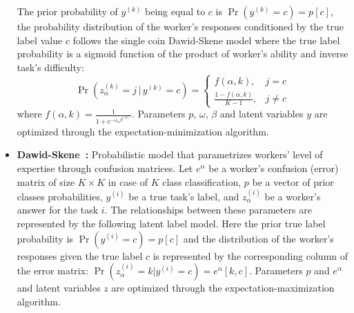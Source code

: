 \documentclass[default]{bst/sn-jnl_mine}%
\begin{document}
\begin{itemize}
    The prior probability of $y^{(k)}$ being equal to $c$ is $\Pr(y^{(k)} = c) = p[c]$,
    the probability distribution of the worker's responses conditioned by the true label value $c$ follows the single coin Dawid-Skene model where the true label probability is a sigmoid function of the product of worker's ability and inverse task's difficulty:
    \begin{equation}
        \Pr \left( z^{(k)}_\alpha = j \, \vert \, y^{(k)} = c \right) = \begin{cases}f(\alpha, k), & j = c \\ \frac{1 - f(\alpha, k)}{K-1}, & j \neq c \end{cases}
    \end{equation}
    where $f(\alpha, k) = \frac{1}{1 + e^{-\omega_{\alpha} \beta^{(k)} }}$.
    Parameters $p$, $\omega$, $\beta$ and latent variables $y$ are optimized through the expectation-minimization algorithm.
    \item \textbf{Dawid-Skene~\cite{dawid_Maximum_1979,crowdkit_webpage_documentation}:}
    Probabilistic model that parametrizes workers' level of expertise through confusion matrices.  Let $e^{\alpha}$ be a worker's confusion (error) matrix of size $K \times K$ in case of $K$ class classification, $p$ be a vector of prior classes probabilities, $y^{(i)}$ be a true task's label, and $z_{\alpha}^{(i)}$ be a worker's answer for the task $i$. The relationships between these parameters are represented by the following latent label model.
    Here the prior true label probability is $\Pr(y^{(i)} = c) = p[c]$ and the distribution of the worker's responses given the true label $c$ is represented by the
    corresponding column of the error matrix: $\Pr(z_{\alpha}^{(i)} = k \vert y^{(i)} = c) = e^{\alpha}[k, c]$.
    Parameters $p$ and $e^{\alpha}$ and latent variables $z$ are optimized through the expectation-maximization algorithm.
\end{itemize}
\end{document}
